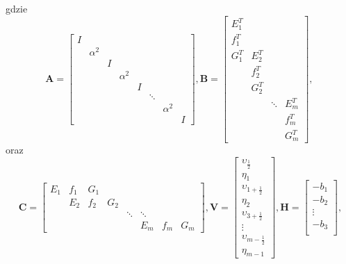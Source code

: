 \documentclass[12pt]{article}
\begin{document}
gdzie 
\begin{equation}
\textbf{A} = \begin{bmatrix}
I &  &  &  &  &  &  &  \\
& \alpha^2 &  &  &  &  &  &  \\
&  & I &  &  &  &  &  \\
&  &  & \alpha^2 &  &  &  &  \\
&  &  &  & I &  &  &  \\
&  &  &  &  & \ddots &  &  \\
&  &  &  &  &  & \alpha^2 &  \\
&  &  &  &  &  &  & I 
\end{bmatrix},
\textbf{B} = \begin{bmatrix}
E_1^T &  &  &  \\
f_1^T &  &  &  \\
G_1^T & E_2^T &  &  \\
& f_2^T &  &  \\
& G_2^T &  &  \\
&  & \ddots & E_m^T \\
&  &  & f_m^T \\
&  &  & G_m^T 
\end{bmatrix},\
\label{LSS_v11}
\end{equation}
oraz
\begin{equation}
\textbf{C} = \begin{bmatrix}
E_{1} & f_{1} & G_{1} &  &  &  &  &  \\
& E_{2} & f_{2} & G_{2} &  &  &  &  \\
&  &  &  & \ddots & \ddots &  &  \\
&  &  &  &  & E_{m} & f_{m} & G_{m} 
\end{bmatrix},	
\textbf{V} = \begin{bmatrix}
\upsilon_{\frac{1}{2}} \\
\eta_{1} \\
\upsilon_{1 + \frac{1}{2}} \\
\eta_{2} \\
\upsilon_{3 + \frac{1}{2}} \\
\vdots \\
\upsilon_{m - \frac{1}{2}} \\
\eta_{m-1} 
\end{bmatrix},
\textbf{H} = \begin{bmatrix}
-b_{1} \\
-b_{2} \\
\vdots \\
-b_{3}\\
\end{bmatrix},
\label{LSS_v12}
\end{equation}
\end{document}
